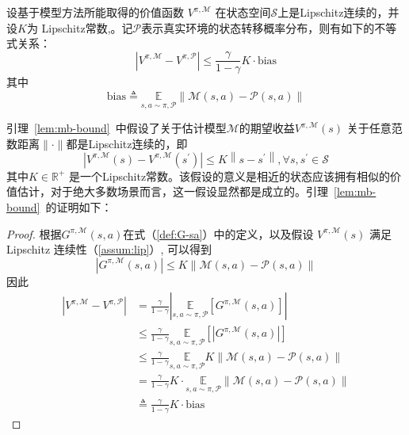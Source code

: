 \begin{lemma}\label{lem:mb-bound}
设基于模型方法所能取得的价值函数 ${V}^{\pi,\mathcal{M}}$ 在状态空间$\mathcal{S}$上是Lipschitz连续的，并设$K$为 Lipschitz常数,。记$\mathcal{P}$表示真实环境的状态转移概率分布，则有如下的不等式关系：
\begin{equation}
\left|{V}^{\pi, \mathcal{M}}-{V}^{\pi, \mathcal{P}}\right| \leq\frac{\gamma}{1-\gamma}K\cdot\mathrm{bias}
\end{equation}
其中
\begin{equation}
\mathrm{bias} \triangleq \underset{s,a\sim \pi,\mathcal{P}}{\mathbb{E}}\left\|\mathcal{M}(s, a)-\mathcal{P}(s, a)\right\|
\end{equation}

\label{theo:mb-bound}
\end{lemma}

引理~\ref{lem:mb-bound}~中假设了关于估计模型$\mathcal{M}$的期望收益${V}^{\pi,\mathcal{M}}(s)$ 关于任意范数距离$\|\cdot\|$都是Lipschitz连续的，即
\begin{equation}\label{assum:lip}
    \left|{V}^{\pi,\mathcal{M}}(s)-{V}^{\pi,\mathcal{M}}(s^{\prime})\right| \leq K\left\|s-s^{\prime}\right\|, \forall s, s^{\prime} \in \mathcal{S}
\end{equation}
其中$K\in \mathbb{R}^+$ 是一个Lipschitz常数。该假设的意义是相近的状态应该拥有相似的价值估计，对于绝大多数场景而言，这一假设显然都是成立的。引理~\ref{lem:mb-bound}~的证明如下：

\begin{proof}

根据$G^{\pi,\mathcal{M}}(s,a)$在式（\ref{def:G-sa}）中的定义，以及假设 ${V}^{\pi,\mathcal{M}}(s)$ 满足 Lipschitz 连续性（\ref{assum:lip}）, 可以得到
\begin{equation}\label{eq:G-leq}
|G^{\pi,\mathcal{M}}(s,a)|\leq K\|\mathcal{M}(s,a)-\mathcal{P}(s,a)\|
\end{equation}
因此
\begin{align}
\left|{V}^{\pi, \mathcal{M}}-{V}^{\pi, \mathcal{P}}\right| &= \frac{\gamma}{1-\gamma}\left|\underset{s,a\sim\pi,\mathcal{P}}{\mathbb{E}}\left[G^{\pi,\mathcal{M}}(s,a)\right]\right|\\
&\leq \frac{\gamma}{1-\gamma}\underset{s,a\sim\pi,\mathcal{P}}{\mathbb{E}}\left[\left|G^{\pi,\mathcal{M}}(s,a)\right|\right]\\
&\leq \frac{\gamma}{1-\gamma}\underset{s,a\sim\pi,\mathcal{P}}{\mathbb{E}}K\|\mathcal{M}(s,a)-\mathcal{P}(s,a)\|\\
&= \frac{\gamma}{1-\gamma}K\cdot\underset{s,a\sim\pi,\mathcal{P}}{\mathbb{E}}\|\mathcal{M}(s,a)-\mathcal{P}(s,a)\|\\
&\triangleq \frac{\gamma}{1-\gamma}K\cdot\mathrm{bias}
\end{align}

\end{proof}

